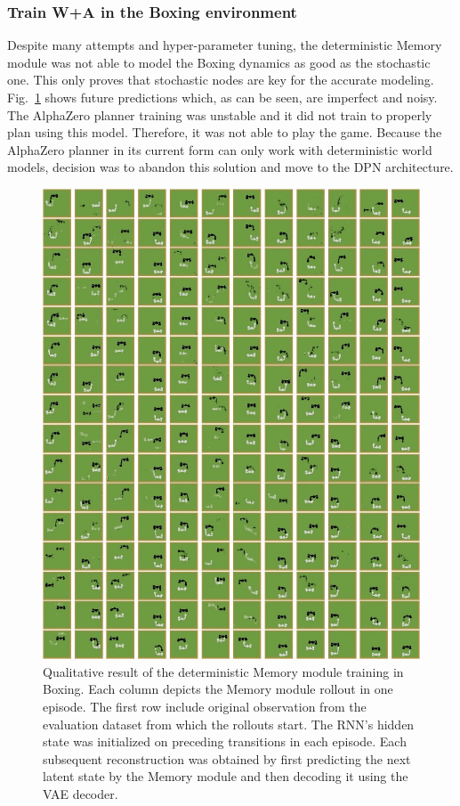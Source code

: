 \subsubsection{Train W+A in the Boxing environment}

Despite many attempts and hyper-parameter tuning, the deterministic Memory module was not able to model the Boxing dynamics as good as the stochastic one. This only proves that stochastic nodes are key for the accurate modeling. Fig.~\ref{Fig.WM_Boxing_deterministic_memory} shows future predictions which, as can be seen, are imperfect and noisy. The AlphaZero planner training was unstable and it did not train to properly plan using this model. Therefore, it was not able to play the game. Because the AlphaZero planner in its current form can only work with deterministic world models, decision was to abandon this solution and move to the DPN architecture.

\begin{figure}[H]
\includegraphics[width=1\textwidth,keepaspectratio]{figures/Boxing_deterministic_memory.JPG}
\caption[Qualitative result of the World Models' deterministic Memory module training in Boxing]{Qualitative result of the deterministic Memory module training in Boxing. Each column depicts the Memory module rollout in one episode. The first row include original observation from the evaluation dataset from which the rollouts start. The RNN's hidden state was initialized on preceding transitions in each episode. Each subsequent reconstruction was obtained by first predicting the next latent state by the Memory module and then decoding it using the VAE decoder.}
\label{Fig.WM_Boxing_deterministic_memory}
\end{figure}

